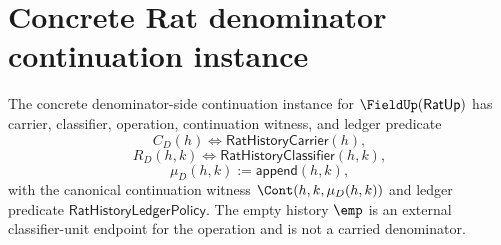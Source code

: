 \section{Concrete Rat denominator continuation instance}
\label{sec:field-rat-denominator-concrete-continuation-instance}

\begin{definition}
\label{def:field-rat-denominator-concrete-continuation-instance}
The concrete denominator-side continuation instance for
$\FieldUp(\mathsf{RatUp})$ has carrier, classifier, operation, continuation
witness, and ledger predicate
$$
C_D(h)\Longleftrightarrow\mathsf{RatHistoryCarrier}(h),
$$
$$
R_D(h,k)\Longleftrightarrow\mathsf{RatHistoryClassifier}(h,k),
$$
$$
\mu_D(h,k):=\mathsf{append}(h,k),
$$
with the canonical continuation witness
$\Cont(h,k,\mu_D(h,k))$ and ledger predicate
$\mathsf{RatHistoryLedgerPolicy}$. The empty history $\emp$ is an external
classifier-unit endpoint for the operation and is not a carried denominator.
\end{definition}

